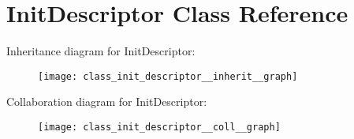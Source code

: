 \hypertarget{class_init_descriptor}{}\section{Init\+Descriptor Class Reference}
\label{class_init_descriptor}


Inheritance diagram for Init\+Descriptor\+:
\nopagebreak
\begin{figure}[H]
\begin{center}
\leavevmode
\texttt{[image: class\_init\_descriptor\_\_inherit\_\_graph]}
\end{center}
\end{figure}


Collaboration diagram for Init\+Descriptor\+:
\nopagebreak
\begin{figure}[H]
\begin{center}
\leavevmode
\texttt{[image: class\_init\_descriptor\_\_coll\_\_graph]}
\end{center}
\end{figure}
